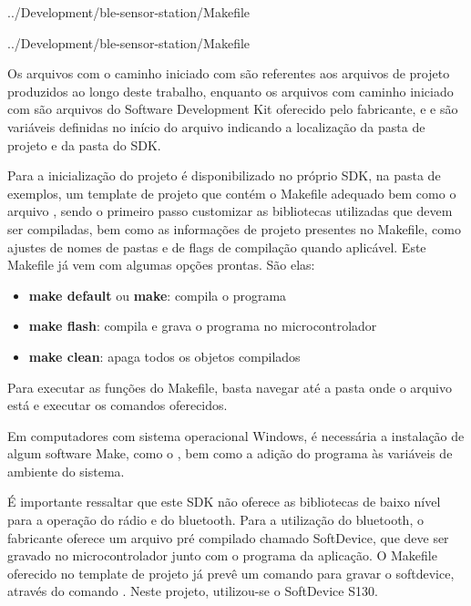 \begin{minipage}{0.95\linewidth} 
 
{../Development/ble-sensor-station/Makefile}
\end{minipage}

\begin{minipage}{0.95\linewidth} 
 
{../Development/ble-sensor-station/Makefile}
\end{minipage}

Os arquivos com o caminho iniciado com  são referentes
aos arquivos de projeto produzidos ao longo deste trabalho, enquanto os arquivos
com caminho iniciado com  são arquivos do Software
Development Kit oferecido pelo fabricante, e  e
 são variáveis definidas no início do arquivo indicando a
localização da pasta de projeto e da pasta do SDK.

Para a inicialização do projeto é disponibilizado no próprio SDK, na pasta de
exemplos, um template de projeto que contém o Makefile adequado bem como o
arquivo , sendo o primeiro passo customizar as bibliotecas
utilizadas que devem ser compiladas, bem como as informações de projeto
presentes no Makefile, como ajustes de nomes de pastas e de flags de compilação
quando aplicável. Este Makefile já vem com algumas opções prontas. São elas:

\begin{itemize}
  \item \textbf{make default} ou \textbf{make}: compila o programa
  \item \textbf{make flash}: compila e grava o programa no microcontrolador
  \item \textbf{make clean}: apaga todos os objetos compilados
\end{itemize}

Para executar as funções do Makefile, basta navegar até a pasta onde o arquivo
está e executar os comandos oferecidos.

Em computadores com sistema operacional Windows, é necessária a instalação de
algum software Make, como o , bem como a adição
do programa às variáveis de ambiente do sistema.

É importante ressaltar que este SDK não oferece as bibliotecas de
baixo nível para a operação do rádio e do bluetooth. Para a utilização do bluetooth, o
fabricante oferece um arquivo pré compilado chamado SoftDevice, que deve ser
gravado no microcontrolador junto com o programa da aplicação. O Makefile
oferecido no template de projeto já prevê um comando para gravar o softdevice,
através do comando . Neste projeto,
utilizou-se o SoftDevice S130.

